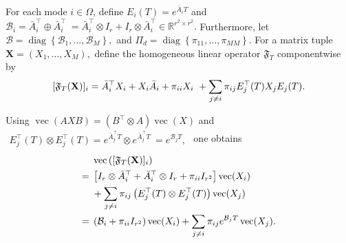 \documentclass[conference]{IEEEtran}
\begin{document}
	For each mode $i\in\Omega$, define
	$
	E_i(T)
	=
	e^{\bar A_iT}
	$
	and
	$
	\mathcal B_i
	=
	\bar A_i^\top\oplus\bar A_i^\top\
	=
	\bar A_i^\top\otimes I_r
	+
	I_r\otimes\bar A_i^\top
	\in\mathbb R^{r^2\times r^2}.
	$
	Furthermore, let
	$
	\mathscr B
	=
	\operatorname{diag}
	\left\{
	\mathcal B_1,\ldots,\mathcal B_M
	\right\},
	$
	and
	$
	\Pi_d
	=
	\operatorname{diag}
	\left\{
	\pi_{11},\ldots,\pi_{MM}
	\right\}.
	$
	For a matrix tuple
	$
	\mathbf X
	=
	(X_1,\ldots,X_M),
	$
	define the homogeneous linear operator
	$\mathfrak F_T$ componentwise by
	\vspace{-0.2\baselineskip}
	\begin{equation}
		\begin{aligned}
			[\mathfrak F_T(\mathbf X)]_i
			={}
			\bar A_i^\top X_i
			+
			X_i\bar A_i
			+
			\pi_{ii}X_i
			\
			+
			\sum_{j\ne i}
			\pi_{ij}
			E_j^\top(T)X_jE_j(T).
		\end{aligned}
		\label{eq:FT_operator}
		\vspace{-0.2\baselineskip}
	\end{equation}
	
	Using
	$
	\operatorname{vec}(AXB)
	=
	(B^\top\otimes A)\operatorname{vec}(X)
	$
	and
	$
	\begin{aligned}
		E_j^\top(T)\otimes E_j^\top(T)
		=
		e^{\bar A_j^\top T}
		\otimes
		e^{\bar A_j^\top T}\
		=
		e^{\mathcal B_jT},
	\end{aligned}
	$
	one obtains
	\vspace{-0.2\baselineskip}
	\begin{align}
		&
		\operatorname{vec}
		\left(
		[\mathfrak F_T(\mathbf X)]_i
		\right)
		\nonumber\\
		={}&
		\left[
		I_r\otimes\bar A_i^\top
		+
		\bar A_i^\top\otimes I_r
		+
		\pi_{ii}I_{r^2}
		\right]
		\operatorname{vec}(X_i)
		\nonumber\\
		&+
		\sum_{j\ne i}
		\pi_{ij}
		\left(
		E_j^\top(T)\otimes E_j^\top(T)
		\right)
		\operatorname{vec}(X_j)
		\nonumber\\
		={}&
		\left(
		\mathcal B_i+\pi_{ii}I_{r^2}
		\right)
		\operatorname{vec}(X_i)
		+
		\sum_{j\ne i}
		\pi_{ij}
		e^{\mathcal B_jT}
		\operatorname{vec}(X_j).		
		\label{eq:component_vectorization}
		\vspace{-0.2\baselineskip}
	\end{align}
	
\end{document}

